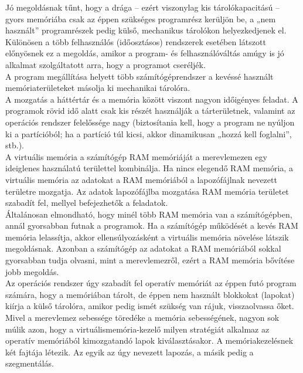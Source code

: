 \documentclass[tikz,12pt,margin=0px]{article}
\begin{document}
    \noindent Jó megoldásnak tűnt, hogy a drága – ezért viszonylag kis tárolókapacitású – gyors memóriába csak az éppen szükséges programrész kerüljön be, a „nem használt” programrészek pedig külső, mechanikus tárolókon helyezkedjenek el. Különösen a több felhasználós (időosztásos) rendszerek esetében látszott előnyösnek ez a megoldás, amikor a program- és felhasználóváltás amúgy is jó alkalmat szolgáltatott arra, hogy a programot cseréljék.\\

    \noindent A program megállítása helyett több számítógéprendszer a kevéssé használt memóriaterületeket másolja ki mechanikai tárolóra.\\

    \noindent A mozgatás a háttértár és a memória között viszont nagyon időigényes feladat. A programok rövid idő alatt csak kis részét használják a tárterületnek, valamint az operációs rendszer felelőssége nagy (biztosítania kell, hogy a program ne nyúljon ki a partícióból; ha a partíció túl kicsi, akkor dinamikusan „hozzá kell foglalni”, stb.).\\

    \noindent A virtuális memória a számítógép RAM memóriáját a merevlemezen egy ideiglenes használatú területtel kombinálja. Ha nincs elegendő RAM memória, a virtuális memória az adatokat a RAM memóriából a lapozófájlnak nevezett területre mozgatja. Az adatok lapozófájlba mozgatása RAM memória területet szabadít fel, mellyel befejezhetők a feladatok.\\

    \noindent Általánosan elmondható, hogy minél több RAM memória van a számítógépben, annál gyorsabban futnak a programok. Ha a számítógép működését a kevés RAM memória lelassítja, akkor ellensúlyozásként a virtuális memória növelése látszik megoldásnak. Azonban a számítógép az adatokat a RAM memóriából sokkal gyorsabban tudja olvasni, mint a merevlemezről, ezért a RAM memória bővítése jobb megoldás.\\

    \noindent Az operációs rendszer úgy szabadít fel operatív memóriát az éppen futó program számára, hogy a memóriában tárolt, de éppen nem használt blokkokat (lapokat) kiírja a külső tárolóra, amikor pedig ismét szükség van rájuk, visszaolvassa őket. Mivel a merevlemez sebessége töredéke a memória sebességének, nagyon sok múlik azon, hogy a virtuálismemória-kezelő milyen stratégiát alkalmaz az operatív memóriából kimozgatandó lapok kiválasztásakor. A memóriakezelésnek két fajtája létezik. Az egyik az úgy nevezett lapozás, a másik pedig a szegmentálás.\\
\end{document}

